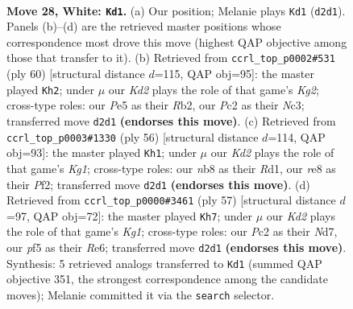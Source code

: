 \documentclass[11pt]{article}
\begin{document}
\begin{figure}[p]
\label{fig:thought-m52}
\end{figure}

\clearpage

\begin{figure}[p]\centering
\begin{subfigure}{0.46\textwidth}\centering
\resizebox{\linewidth}{!}{%
\newchessgame
\chessboard[
  setfen={rn2r1k1/2pnq2p/1p2p1p1/p3Pp2/P2P1P1P/1R3NN1/2PK2PQ/7R w - - 1 28},
  showmover=false,
  pgfstyle=straightmove, color=movearrow, markmove={d2-d1}
]}
\caption{}
\end{subfigure}\hfill
\begin{subfigure}{0.46\textwidth}\centering
\resizebox{\linewidth}{!}{%
\newchessgame
\chessboard[
  setfen={3qr1k1/3r1pp1/1p1pp2p/pNn5/PnP1PP1P/1PN2QP1/1R4K1/3R4 w - - 8 31},
  showmover=false,
  pgfstyle=straightmove, color=movearrow, markmove={g2-h2}
]}
\caption{}
\end{subfigure}
\\[4pt]
\begin{subfigure}{0.46\textwidth}\centering
\resizebox{\linewidth}{!}{%
\newchessgame
\chessboard[
  setfen={2r5/2qr1ppk/pp1ppnnp/8/2P1P3/1PNRQN1P/P4PP1/3R2K1 w - - 2 29},
  showmover=false,
  pgfstyle=straightmove, color=movearrow, markmove={g1-h1}
]}
\caption{}
\end{subfigure}\hfill
\begin{subfigure}{0.46\textwidth}\centering
\resizebox{\linewidth}{!}{%
\newchessgame
\chessboard[
  setfen={1r4k1/q2nnpp1/p1ppr2p/4p3/PP2P3/1NQPP2P/2R3PK/1R3N2 b - - 4 29},
  showmover=false,
  pgfstyle=straightmove, color=movearrow, markmove={g8-h7}
]}
\caption{}
\end{subfigure}
\caption{\textbf{Move 28, White: \texttt{Kd1}.} (a) Our position; Melanie plays \texttt{Kd1} (\texttt{d2d1}). Panels (b)--(d) are the retrieved master positions whose correspondence most drove this move (highest QAP objective among those that transfer to it). (b) Retrieved from \texttt{ccrl\_top\_p0002\#531} (ply 60) [structural distance $d$=115, QAP obj=95]: the master played \texttt{Kh2}; under $\mu$ our \emph{Kd2} plays the role of that game's \emph{Kg2}; cross-type roles: our \emph{P}e5 as their \emph{R}b2, our \emph{P}c2 as their \emph{N}c3; transferred move \texttt{d2d1} \textbf{(endorses this move)}. (c) Retrieved from \texttt{ccrl\_top\_p0003\#1330} (ply 56) [structural distance $d$=114, QAP obj=93]: the master played \texttt{Kh1}; under $\mu$ our \emph{Kd2} plays the role of that game's \emph{Kg1}; cross-type roles: our \emph{n}b8 as their \emph{R}d1, our \emph{r}e8 as their \emph{P}f2; transferred move \texttt{d2d1} \textbf{(endorses this move)}. (d) Retrieved from \texttt{ccrl\_top\_p0000\#3461} (ply 57) [structural distance $d$=97, QAP obj=72]: the master played \texttt{Kh7}; under $\mu$ our \emph{Kd2} plays the role of that game's \emph{Kg1}; cross-type roles: our \emph{P}c2 as their \emph{N}d7, our \emph{p}f5 as their \emph{R}e6; transferred move \texttt{d2d1} \textbf{(endorses this move)}. Synthesis: 5 retrieved analogs transferred to \texttt{Kd1} (summed QAP objective 351, the strongest correspondence among the candidate moves); Melanie committed it via the \texttt{search} selector.}

\end{figure}
\end{document}
